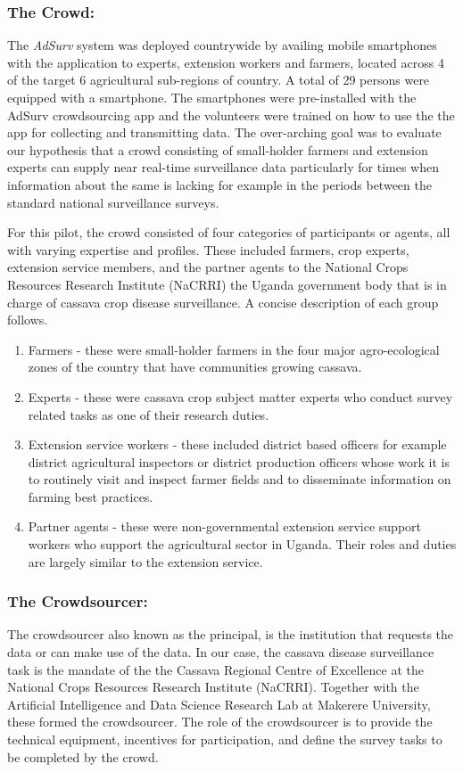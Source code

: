 \documentclass[letterpaper]{article} %
\begin{document}
\subsubsection{The Crowd:}
The \emph{AdSurv} system was deployed countrywide by availing mobile smartphones with the application to experts, extension workers and farmers, located across 4 of the target 6 agricultural sub-regions of country. A total of 29 persons were equipped with a smartphone.  The smartphones were pre-installed with the AdSurv crowdsourcing app and the volunteers were trained on how to use the the app for collecting and transmitting data. The over-arching goal was to evaluate our hypothesis that a crowd consisting of small-holder farmers and extension experts can supply near real-time surveillance data particularly for times when information about the same is lacking for example in the periods between the standard national surveillance surveys.

For this pilot, the crowd consisted of four categories of participants or agents, all with varying expertise and profiles. These included farmers, crop experts, extension service members, and the partner agents to the National Crops Resources Research Institute (NaCRRI) the Uganda government body that is in charge of cassava crop disease surveillance. A concise description of each group follows.
\begin{enumerate}
\item Farmers - these were small-holder farmers in the four major agro-ecological zones of the country that have communities growing cassava.
\item Experts - these were cassava crop subject matter experts who conduct survey related tasks as one of their research duties.
\item Extension service workers - these included district based officers for example district agricultural inspectors or district production officers whose work it is to routinely visit and inspect farmer fields and to disseminate information on farming best practices.
\item Partner agents - these were non-governmental extension service support workers who support the agricultural sector in Uganda. Their roles and duties are largely similar to the extension service.
\end{enumerate}

\subsubsection{The Crowdsourcer:}
The crowdsourcer also known as the principal, is the institution that requests the data or can make use of the data. In our case, the cassava disease surveillance task is the mandate of the the Cassava Regional Centre of Excellence at the National Crops Resources Research Institute (NaCRRI). Together with the Artificial Intelligence and Data Science Research Lab at Makerere University, these formed the crowdsourcer. The role of the crowdsourcer is to provide the technical equipment, incentives for participation, and define the survey tasks to be completed by the crowd.
\end{document}
